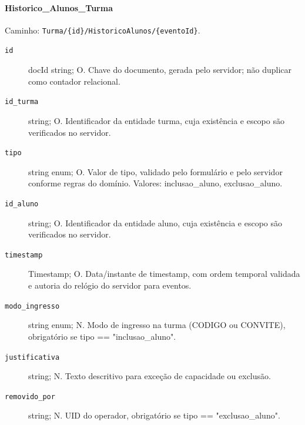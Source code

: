 \paragraph{Historico\_Alunos\_Turma}\mbox{}\par
Caminho: \texttt{Turma/\{id\}/HistoricoAlunos/\{eventoId\}}.
\begin{description}
\item[\texttt{id}] docId string; O. Chave do documento, gerada pelo servidor; não duplicar como contador relacional.
\item[\texttt{id\_turma}] string; O. Identificador da entidade turma, cuja existência e escopo são verificados no servidor.
\item[\texttt{tipo}] string enum; O. Valor de tipo, validado pelo formulário e pelo servidor conforme regras do domínio. Valores: inclusao\_aluno, exclusao\_aluno.
\item[\texttt{id\_aluno}] string; O. Identificador da entidade aluno, cuja existência e escopo são verificados no servidor.
\item[\texttt{timestamp}] Timestamp; O. Data/instante de timestamp, com ordem temporal validada e autoria do relógio do servidor para eventos.
\item[\texttt{modo\_ingresso}] string enum; N. Modo de ingresso na turma (CODIGO ou CONVITE), obrigatório se tipo == "inclusao\_aluno".
\item[\texttt{justificativa}] string; N. Texto descritivo para exceção de capacidade ou exclusão.
\item[\texttt{removido\_por}] string; N. UID do operador, obrigatório se tipo == "exclusao\_aluno".
\end{description}

